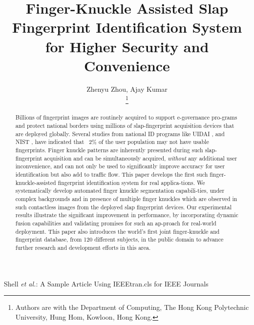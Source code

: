 \documentclass[lettersize, journal]{IEEEtran}
\begin{document}
\title{Finger-Knuckle Assisted Slap Fingerprint Identification System for Higher Security and Convenience}

\author{{Zhenyu Zhou, Ajay Kumar}

\thanks{Authors are with the Department of Computing, The Hong Kong Polytechnic University, Hung Hom, Kowloon, Hong Kong.}}

%
{Shell \MakeLowercase{\textit{et al.}}: A Sample Article Using IEEEtran.cls for IEEE Journals}

\maketitle

\begin{abstract}
  Billions of fingerprint images are routinely acquired to support e-governance pro-grams and protect national borders using millions of slap-fingerprint acquisition devices that are deployed globally. Several studies from national ID programs like UIDAI \cite{uidai}, and NIST \cite{2002SUMMARYON}, have indicated that ~2\% of the user population may not have usable fingerprints. Finger knuckle patterns are inherently presented during such slap-fingerprint acquisition and can be simultaneously acquired, \textit{without} any additional user inconvenience, and can not only be used to significantly improve accuracy for user identification but also add to traffic flow. This paper develops the first such finger-knuckle-assisted fingerprint identification system for real applica-tions. We systematically develop automated finger knuckle segmentation capabili-ties, under complex backgrounds and in presence of multiple finger knuckles which are observed in such contactless images from the deployed slap fingerprint devices. Our experimental results illustrate the significant improvement in performance, by incorporating dynamic fusion capabilities and validating promises for such an ap-proach for real-world deployment. This paper also introduces the world’s first joint finger-knuckle and fingerprint database, from 120 different subjects, in the public domain to advance further research and development efforts in this area.

\end{abstract}
\end{document}
